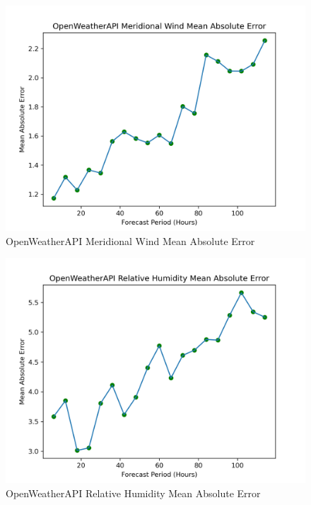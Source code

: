 \begin{appendices}
    \begin{figure}[H]
        \centering
        \includegraphics[width=.7\linewidth]{Graphs/accuracy/appendices/openweatherapi/meridional_wind/mean_absolute_error.png}
        \caption{OpenWeatherAPI Meridional Wind Mean Absolute Error}
    \end{figure}
    
    \begin{figure}[H]
        \centering
        \includegraphics[width=.7\linewidth]{Graphs/accuracy/appendices/openweatherapi/relative_humidity/mean_absolute_error.png}
        \caption{OpenWeatherAPI Relative Humidity Mean Absolute Error}
    \end{figure}
    

\end{appendices}
